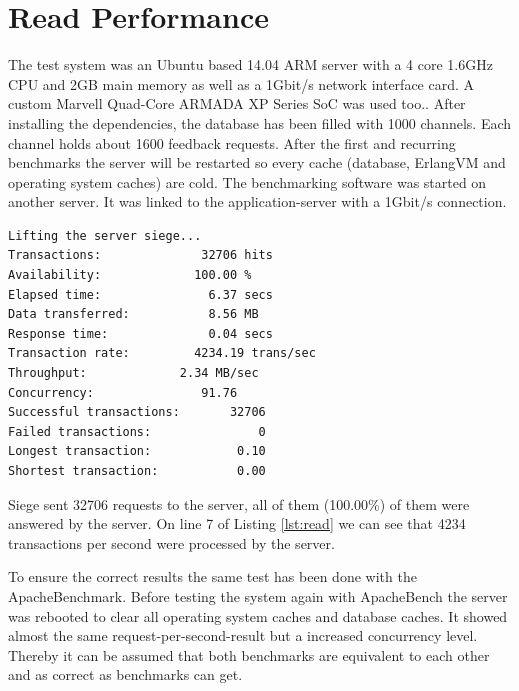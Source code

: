 \section{Read Performance} \label{r_perf}
The test system was an Ubuntu based 14.04 ARM server with a 4 core 1.6GHz CPU and 2GB main memory as well as a 1Gbit/s network interface card.  A custom Marvell Quad-Core ARMADA XP Series SoC was used too.\cite{MarArm}.  
After installing the dependencies, the database has been filled with 1000 channels. Each channel holds about 1600 feedback requests. After the first and recurring benchmarks the server will be restarted so every cache (database, ErlangVM and operating system caches) are cold. The benchmarking software was started on another server. It was linked to the application-server with a 1Gbit/s connection.

\lstset{
    frame=nil,
    language=bash,
    keepspaces=true, 
    numbers=left,
    breaklines=true,
    basicstyle=\ttfamily,
}

\begin{lstlisting}[caption={read benchmark by siege},label=lst:read]
Lifting the server siege...
Transactions:		       32706 hits
Availability:		      100.00 %
Elapsed time:		        6.37 secs
Data transferred:	        8.56 MB
Response time:		        0.04 secs
Transaction rate:	      4234.19 trans/sec
Throughput:		        2.34 MB/sec
Concurrency:		       91.76
Successful transactions:       32706
Failed transactions:	           0
Longest transaction:	        0.10
Shortest transaction:	        0.00
\end{lstlisting}
\textcolor{newcode}{Siege sent 32706 requests to the server, all of them (100.00\%) of them were answered by the server. On line 7 of  Listing \ref{lst:read} we can see that 4234 transactions per second were processed by the server.}

To ensure the correct results the same test has been done with the ApacheBenchmark. Before testing the system again with ApacheBench the server was rebooted to clear all operating system caches and database caches. It showed almost the same request-per-second-result but a increased concurrency level. Thereby  it can be assumed that both benchmarks are equivalent to each other and as correct as benchmarks can get. 

